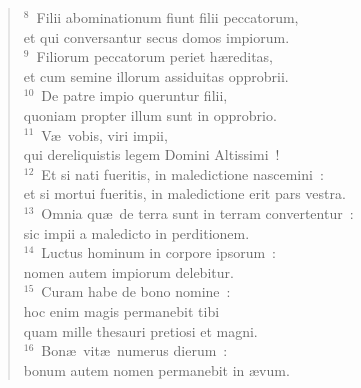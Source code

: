 \begin{verse}${}^{8}$~Filii abominationum fiunt filii peccatorum,\\ et qui conversantur secus domos impiorum.\\
${}^{9}$~Filiorum peccatorum periet h\ae reditas,\\ et cum semine illorum assiduitas opprobrii.\\
${}^{10}$~De patre impio queruntur filii,\\ quoniam propter illum sunt in opprobrio.\\
${}^{11}$~V\ae\ vobis, viri impii,\\ qui dereliquistis legem Domini Altissimi~!\\
${}^{12}$~Et si nati fueritis, in maledictione nascemini~:\\ et si mortui fueritis, in maledictione erit pars vestra.\\
${}^{13}$~Omnia qu\ae\ de terra sunt in terram convertentur~:\\ sic impii a maledicto in perditionem.\\
${}^{14}$~Luctus hominum in corpore ipsorum~:\\ nomen autem impiorum delebitur.\\
${}^{15}$~Curam habe de bono nomine~:\\ hoc enim magis permanebit tibi\\ quam mille thesauri pretiosi et magni.\\
${}^{16}$~Bon\ae\ vit\ae\ numerus dierum~:\\ bonum autem nomen permanebit in \ae vum.\end{verse}



